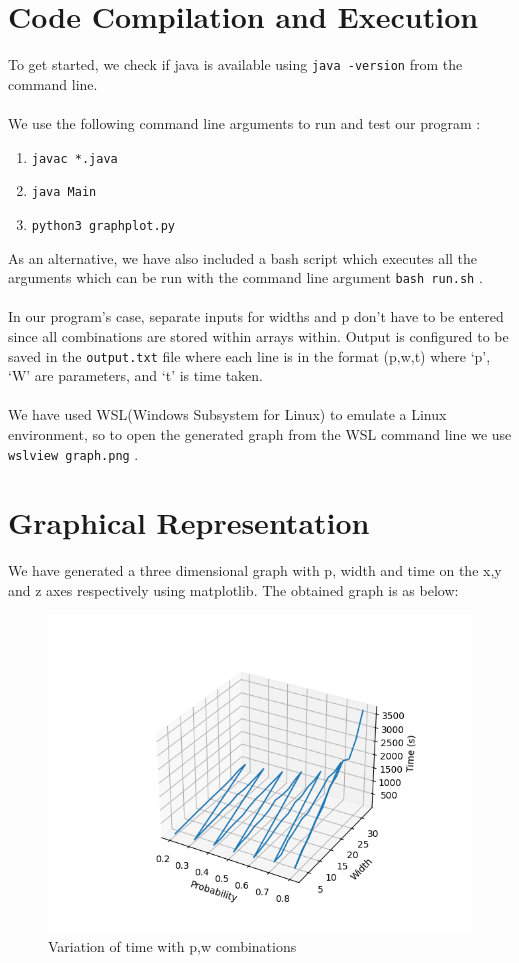 \documentclass{article}
\let\oldtexttt\texttt
\renewcommand{\texttt}[1]{
  \colorbox{bgcolor}{\oldtexttt{#1}}
  }
\begin{document}
\section{Code Compilation and Execution} 
To get started, we check if java is available using \texttt{java -version} from the command line.
\\\\We use the following command line arguments to run and test our program : 
\begin{enumerate}
    \item  \texttt{javac *.java}
    \item  \texttt{java Main}
    \item  \texttt{python3 graphplot.py}
\end{enumerate}
As an alternative, we have also included a bash script which executes all the arguments which can be run with the command line argument \texttt{bash run.sh}.
\\\\In our program's case, separate inputs for widths and p don't have to be entered since all combinations are stored within arrays within. Output is configured to be saved in the \texttt{output.txt} file where each line is in the format (p,w,t) where `p', `W' are parameters, and `t' is time taken.
\\\\We have used WSL(Windows Subsystem for Linux) to emulate a Linux environment, so to open the generated graph from the WSL command line we use \texttt{wslview graph.png}.

\section{Graphical Representation}

We have generated a three dimensional graph with p, width and time on the x,y and z axes respectively using matplotlib. The obtained graph is as below:
\begin{figure}[hbt]
    \centering
    \includegraphics[scale=0.9]{graph.png}
    \caption{Variation of time with p,w combinations}
    \label{fig:graphfinal}
\end{figure}
\end{document}
